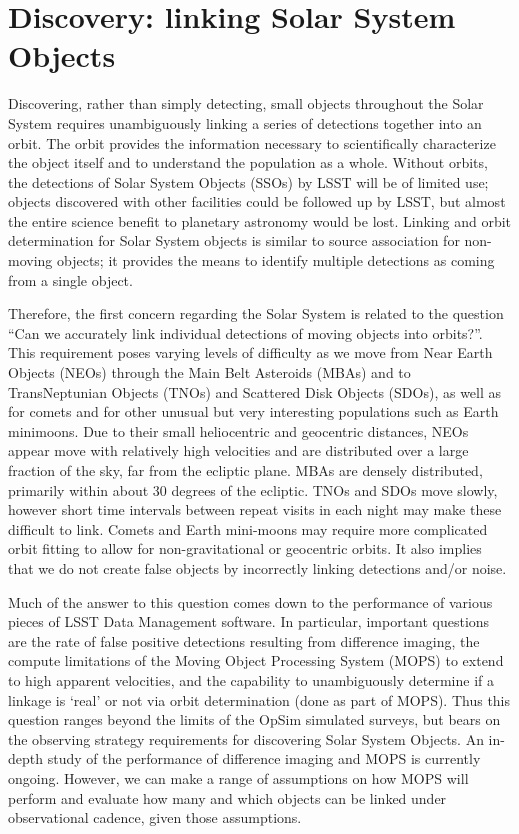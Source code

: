
\section{Discovery: linking Solar System Objects}
\def\secname{\chpname:discovery}\label{sec:\secname}

Discovering, rather than simply detecting, small objects throughout
the Solar System requires unambiguously linking a series of detections
together into an orbit. The orbit provides the information necessary
to scientifically characterize the object itself and to understand the
population as a whole. Without orbits, the detections of Solar System
Objects (SSOs) by LSST will be of limited use; objects discovered with
other facilities could be followed up by LSST, but almost the entire
science benefit to planetary astronomy would be lost. Linking and
orbit determination for Solar System objects is similar to source
association for non-moving objects; it provides the means to identify
multiple detections as coming from a single object.

Therefore, the first concern regarding the Solar System is related
to the question ``Can we accurately link individual detections of moving objects into
orbits?''.  This requirement poses varying levels of difficulty as we
move from Near Earth Objects (NEOs) through the Main Belt Asteroids
(MBAs) and to TransNeptunian Objects (TNOs) and Scattered Disk Objects
(SDOs), as well as for comets and for other unusual but very
interesting populations such as Earth minimoons. Due to their small
heliocentric and geocentric distances, NEOs appear move with
relatively high velocities and are distributed over a large fraction
of the sky, far from the ecliptic plane. MBAs are densely distributed,
primarily within about 30 degrees of the ecliptic. TNOs and SDOs move
slowly, however short time intervals between repeat visits in each night may make these difficult
to link. Comets and Earth mini-moons may require more complicated
orbit fitting to allow for non-gravitational or geocentric
orbits. It also implies that we do not create false objects by
incorrectly linking detections and/or noise.

Much of the answer to this question comes down to the performance of
various pieces of LSST Data Management software. In particular,
important questions are the
rate of false positive detections resulting from difference imaging, the compute
limitations of the Moving Object Processing System (MOPS) to extend to high
apparent velocities, and the capability to unambiguously determine if
a linkage is `real' or not via orbit determination (done as part of
MOPS). Thus this question ranges beyond the limits of the OpSim simulated
surveys, but bears on the observing strategy requirements for
discovering Solar System Objects. An in-depth study of the performance
of difference imaging and MOPS is currently ongoing. However, we can
make a range of assumptions on how MOPS will perform and evaluate how
many and which objects can be linked under observational cadence, given those assumptions.


